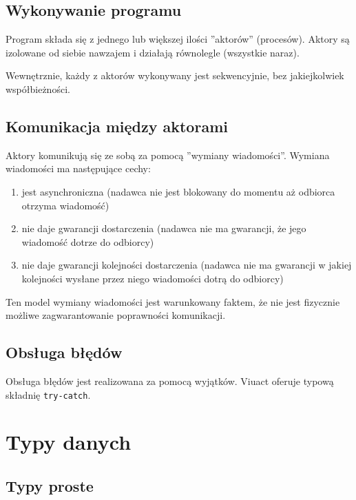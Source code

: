 \documentclass[11pt,oneside,a4paper,titlepage,onecolumn]{article}
\begin{document}
\subsection{Wykonywanie programu}

Program składa się z jednego lub większej ilości ''aktorów'' (procesów).
Aktory są izolowane od siebie nawzajem i działają równolegle (wszystkie naraz).

Wewnętrznie, każdy z aktorów wykonywany jest sekwencyjnie, bez jakiejkolwiek
współbieżności.

\subsection{Komunikacja między aktorami}

Aktory komunikują się ze sobą za pomocą ''wymiany wiadomości''.
Wymiana wiadomości ma następujące cechy:

\begin{enumerate}
    \item jest asynchroniczna (nadawca nie jest blokowany do momentu aż odbiorca otrzyma
        wiadomość)
    \item nie daje gwarancji dostarczenia (nadawca nie ma gwarancji, że jego wiadomość
        dotrze do odbiorcy)
    \item nie daje gwarancji kolejności dostarczenia (nadawca nie ma gwarancji w jakiej
        kolejności wysłane przez niego wiadomości dotrą do odbiorcy)
\end{enumerate}

Ten model wymiany wiadomości jest warunkowany faktem, że nie jest fizycznie
możliwe zagwarantowanie poprawności komunikacji.

\subsection{Obsługa błędów}

Obsługa błędów jest realizowana za pomocą wyjątków. Viuact oferuje typową
składnię \texttt{try-catch}.

\newpage
\section{Typy danych}

\subsection{Typy proste}
\end{document}
